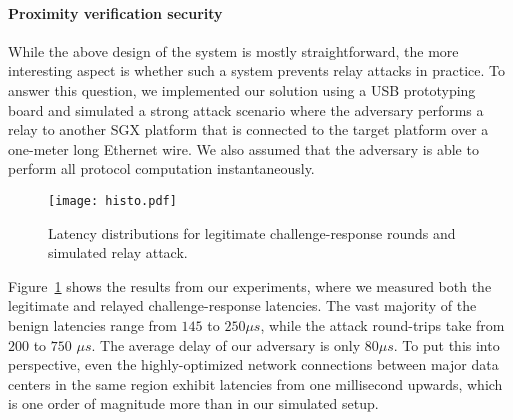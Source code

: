 

\paragraph{Proximity verification security} While the above design of the \proximitee system is mostly straightforward, the more interesting aspect is whether such a system prevents relay attacks in practice. To answer this question, we implemented our solution using a USB prototyping board and simulated a strong attack scenario where the adversary performs a relay to another SGX platform that is connected to the target platform over a one-meter long Ethernet wire. We also assumed that the adversary is able to perform all protocol computation instantaneously. 

\begin{figure}[t]
  \centering
    \texttt{[image: histo.pdf]} 
    \caption{Latency distributions for legitimate challenge-response rounds and simulated relay attack.}
    \label{graph:histogram}
\end{figure}

Figure~\ref{graph:histogram} shows the results from our experiments, where we measured both the legitimate and relayed challenge-response latencies. The vast majority of the benign latencies range from $145$ to $250 \mu s$, while the attack round-trips take from $200$ to $750$ $\mu s$. The average delay of our adversary is only $80 \mu s$. To put this into perspective, even the highly-optimized network connections between major data centers in the same region exhibit latencies from one millisecond upwards, which is one order of magnitude more than in our simulated setup. 


